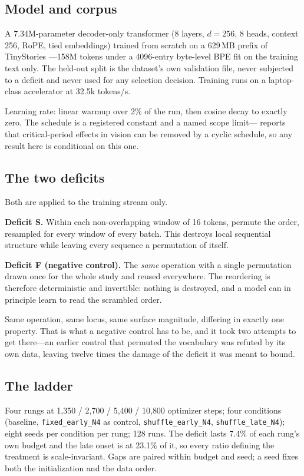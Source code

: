 \documentclass[11pt]{article}
\newcommand{\cond}[1]{\texttt{#1}}
\begin{document}
\subsection{Model and corpus}

A 7.34M-parameter decoder-only transformer (8 layers, $d=256$, 8 heads, context
256, RoPE, tied embeddings) trained from scratch on a 629\,MB prefix of
TinyStories \citep{eldan2023tinystories}---158M tokens under a 4096-entry
byte-level BPE fit on the training text only. The held-out split is the dataset's
own validation file, never subjected to a deficit and never used for any
selection decision. Training runs on a laptop-class accelerator at
32.5k tokens/s.

Learning rate: linear warmup over 2\% of the run, then cosine decay to exactly
zero. The schedule is a registered constant and a named scope limit---%
\citet{pawlak2025occurence} reports that critical-period effects in vision can be
removed by a cyclic schedule, so any result here is conditional on this one.

\subsection{The two deficits}

Both are applied to the training stream only.

\textbf{Deficit S.} Within each non-overlapping window of 16 tokens, permute the
order, resampled for every window of every batch. This destroys local sequential
structure while leaving every sequence a permutation of itself.

\textbf{Deficit F (negative control).} The \emph{same} operation with a single
permutation drawn once for the whole study and reused everywhere. The reordering
is therefore deterministic and invertible: nothing is destroyed, and a model can
in principle learn to read the scrambled order.

Same operation, same locus, same surface magnitude, differing in exactly one
property. That is what a negative control has to be, and it took two attempts to
get there---an earlier control that permuted the vocabulary was refuted by its own
data, leaving twelve times the damage of the deficit it was meant to bound.

\subsection{The ladder}

Four rungs at 1{,}350 / 2{,}700 / 5{,}400 / 10{,}800 optimizer steps; four
conditions (baseline, \cond{fixed\_early\_N4} as control, \cond{shuffle\_early\_N4},
\cond{shuffle\_late\_N4}); eight seeds per condition per rung; 128 runs. The
deficit lasts 7.4\% of each rung's own budget and the late onset is at 23.1\% of
it, so every ratio defining the treatment is scale-invariant. Gaps are paired
within budget and seed; a seed fixes both the initialization and the data order.
\end{document}
